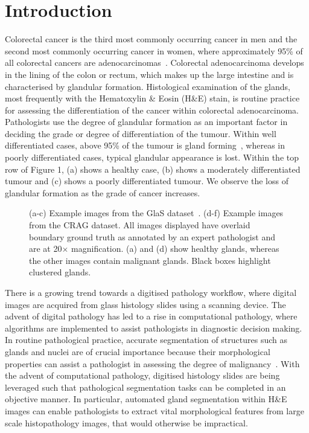 \documentclass[3p]{elsarticle}
\begin{document}
\section{Introduction}
Colorectal cancer is the third most commonly occurring cancer in men and the second most commonly occurring cancer in women, where approximately 95\% of all colorectal cancers are adenocarcinomas~\citep{fleming2012colorectal}. Colorectal adenocarcinoma develops in the lining of the colon or rectum, which makes up the large intestine and is characterised by glandular formation. Histological examination of the glands, most frequently with the Hematoxylin \& Eosin (H\&E) stain, is routine practice for assessing the differentiation of the cancer within colorectal adenocarcinoma. Pathologists use the degree of glandular formation as an important factor in deciding the grade or degree of differentiation of the tumour. Within well differentiated cases, above 95\% of the tumour is gland forming~\citep{fleming2012colorectal}, whereas in poorly differentiated cases, typical glandular appearance is lost. Within the top row of Figure 1, (a) shows a healthy case, (b) shows a moderately differentiated tumour and (c) shows a poorly differentiated tumour. We observe the loss of glandular formation as the grade of cancer increases. 


\begin{figure}[!t]
\captionsetup[subfigure]{labelformat=empty}
\centering
{}
\caption{(a-c) Example images from the GlaS dataset~\citep{sirinukunwattana2017gland}. (d-f) Example images from the CRAG dataset. All images displayed have overlaid boundary ground truth as annotated by an expert pathologist and are at 20$\times$ magnification. (a) and (d) show healthy glands, whereas the other images contain malignant glands. Black boxes highlight clustered glands.
}
\label{fig:detection}
\end{figure}

There is a growing trend towards a digitised pathology workflow, where digital images are acquired from glass histology slides using a scanning device. The advent of digital pathology has led to a rise in computational pathology, where algorithms are implemented to assist pathologists in diagnostic decision making. In routine pathological practice, accurate segmentation of structures such as glands and nuclei are of crucial importance because their morphological properties can assist a pathologist in assessing the degree of malignancy~\citep{compton2000updated,hamilton2000pathology,washington2009protocol}. With the advent of computational pathology, digitised histology slides are being leveraged such that pathological segmentation tasks can be completed in an objective manner. In particular, automated gland segmentation within H\&E images can enable pathologists to extract vital morphological features from large scale histopathology images, that would otherwise be impractical.
\end{document}
